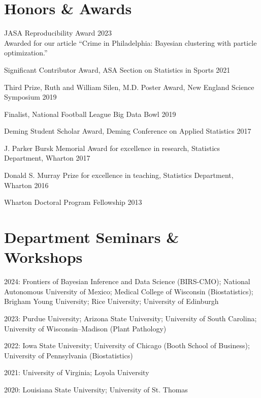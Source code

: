\documentclass[10pt]{article}
\renewenvironment{itemize}{
  \begin{list}{}{
    \setlength{\leftmargin}{1.5em}
  }
}{
  \end{list}
}
\begin{document}
\section*{Honors \& Awards}
\begin{itemize}
\item{JASA Reproducibility Award \hfill 2023 \\
Awarded for our article ``Crime in Philadelphia: Bayesian clustering with particle optimization.''}
\item{Significant Contributor Award, ASA Section on Statistics in Sports \hfill 2021}
\item{Third Prize, Ruth and William Silen, M.D. Poster Award, New England Science Symposium \hfill 2019}
\item{Finalist, National Football League Big Data Bowl \hfill 2019}
\item{Deming Student Scholar Award, Deming Conference on Applied Statistics \hfill 2017}
\item{J. Parker Bursk Memorial Award for excellence in research, Statistics Department, Wharton \hfill  2017}
\item{Donald S. Murray Prize for excellence in teaching, Statistics Department, Wharton \hfill 2016}
\item{Wharton Doctoral Program Fellowship \hfill 2013}
\end{itemize}


\section*{Department Seminars \& Workshops}

\begin{itemize}
\item{2024: Frontiers of Bayesian Inference and Data Science (BIRS-CMO); National Autonomous University of Mexico; Medical College of Wisconsin (Biostatistics); Brigham Young University; Rice University; University of Edinburgh}
\item{2023: Purdue University; Arizona State University; University of South Carolina; University of Wisconsin--Madison (Plant Pathology)}
\item{2022: Iowa State University; University of Chicago (Booth School of Business); University of Pennsylvania (Biostatistics)}
\item{2021: University of Virginia; Loyola University}
\item{2020: Louisiana State University; University of St. Thomas}
\end{itemize}
\end{document}

